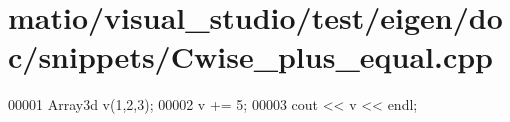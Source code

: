 \hypertarget{matio_2visual__studio_2test_2eigen_2doc_2snippets_2_cwise__plus__equal_8cpp_source}{}\section{matio/visual\+\_\+studio/test/eigen/doc/snippets/\+Cwise\+\_\+plus\+\_\+equal.cpp}
\label{matio_2visual__studio_2test_2eigen_2doc_2snippets_2_cwise__plus__equal_8cpp_source}

\begin{DoxyCode}
00001 Array3d v(1,2,3);
00002 v += 5;
00003 cout << v << endl;
\end{DoxyCode}
